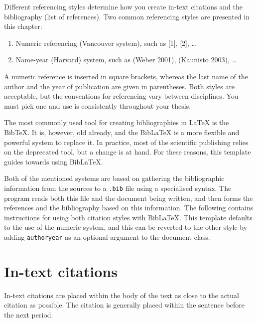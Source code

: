 Different referencing styles determine how you create in-text citations and the bibliography (list of references). Two common referencing styles are presented in this chapter:
\begin{enumerate}
    \item Numeric referencing (Vancouver system), such as [1], [2], \ldots
    \item Name-year (Harvard) system, such as (Weber 2001), (Kaunisto 2003), \ldots
\end{enumerate}
A numeric reference is inserted in square brackets, whereas the last name of the author and the year of publication are given in parentheses. Both styles are acceptable, but the conventions for referencing vary between disciplines. You must pick one and use is consistently throughout your thesis.

The most commonly used tool for creating bibliographies in \LaTeX{} is the Bib\TeX. It is, however, old already, and the Bib\LaTeX{}  is a more flexible and powerful system to replace it. In practice, most of the scientific publishing relies on the deprecated tool, but a change is at hand. For these reasons, this template guides towards using Bib\LaTeX.

Both of the mentioned systems are based on gathering the bibliographic information from the sources to a \texttt{.bib} file using a specialised syntax. The program reads both this file and the document being written, and then forms the references and the bibliography based on this information. The following contains instructions for using both citation styles with Bib\LaTeX. This template defaults to the use of the numeric system, and this can be reverted to the other style by adding \texttt{authoryear} as an optional argument to the document class.

\section{In-text citations}

In-text citations are placed within the body of the text as close to the actual citation as possible. The citation is generally placed within the sentence before the next period.

